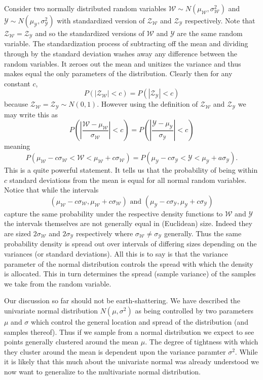 \documentclass{book}
\begin{document}
Consider two normally distributed random variables $\mathscr{W}\sim N(\mu_\mathscr{W},\sigma_\mathscr{W}^2)$ and $\mathscr{Y}\sim N(\mu_\mathscr{Y},\sigma_\mathscr{Y}^2)$ with standardized version of $\mathscr{Z}_\mathscr{W}$ and $\mathscr{Z}_\mathscr{Y}$ respectively. Note that $\mathscr{Z}_\mathscr{W}=\mathscr{Z}_\mathscr{Y}$ and so the standardized versions of $\mathscr{W}$ and $\mathscr{Y}$ are the same random variable. The standardization process of subtracting off the mean and dividing through by the standard deviation washes away any difference between the random variables. It zeroes out the mean and unitizes the variance and thus makes equal the only parameters of the distribution. Clearly then for any constant $c$,
$$
P(\left|\mathscr{Z}_\mathscr{W}\right|<c)=P(\left|\mathscr{Z}_\mathscr{Y}\right|<c)
$$
because $\mathscr{Z}_\mathscr{W}=\mathscr{Z}_\mathscr{Y}\sim N(0,1)$. However using the definition of $\mathscr{Z}_\mathscr{W}$ and $\mathscr{Z}_\mathscr{Y}$ we may write this as
$$
P\left(\left|\frac{\mathscr{W}-\mu_\mathscr{W}}{\sigma_\mathscr{W}}\right|<c\right)=P\left(\left|\frac{\mathscr{Y}-\mu_\mathscr{Y}}{\sigma_\mathscr{Y}}\right|<c\right)
$$
meaning
$$
P\left(\mu_\mathscr{W}-c\sigma_\mathscr{W}<\mathscr{W}<\mu_\mathscr{W}+c\sigma_\mathscr{W}\right)=P\left(\mu_\mathscr{Y}-c\sigma_\mathscr{Y}<\mathscr{Y}<\mu_\mathscr{Y}+a\sigma_\mathscr{Y}\right).
$$
This is a quite powerful statement. It tells us that the probability of being within $c$ standard deviations from the mean is equal for all normal random variables. Notice that while the intervals
$$
\left(\mu_\mathscr{W}-c\sigma_\mathscr{W},\mu_\mathscr{W}+c\sigma_\mathscr{W}\right)\text{ and }\left(\mu_\mathscr{Y}-c\sigma_\mathscr{Y},\mu_\mathscr{Y}+c\sigma_\mathscr{Y}\right)
$$
capture the same probability under the respective density functions to $\mathscr{W}$ and $\mathscr{Y}$ the intervals themselves are not generally equal in (Euclidean) size. Indeed they are sized $2\sigma_\mathscr{W}$ and $2\sigma_\mathscr{Y}$ respectively where $\sigma_{\mathscr{W}}\neq\sigma_{\mathscr{Y}}$ generally. Thus the same probability density is spread out over intervals of differing sizes depending on the variances (or standard deviations). All this is to say is that the variance parameter of the normal distribution controls the spread with which the density is allocated. This in turn determines the spread (sample variance) of the samples we take from the random variable. 

Our discussion so far should not be earth-shattering. We have described the univariate normal distribution $N(\mu,\sigma^2)$ as being controlled by two parameters $\mu$ and $\sigma$ which control the general location and spread of the distribution (and samples thereof). Thus if we sample from a normal distribution we expect to see points generally clustered around the mean $\mu$. The degree of tightness with which they cluster around the mean is dependent upon the variance paramter $\sigma^2$. While it is likely that this much about the univariate normal was already understood we now want to generalize to the multivariate normal distribution. 
\end{document}
